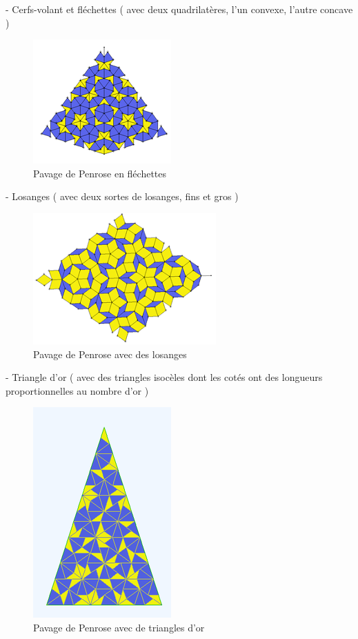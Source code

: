 \documentclass{article}
\begin{document}
- Cerfs-volant et fléchettes ( avec deux quadrilatères, l'un convexe, l'autre concave )

\begin{figure} [h]
    \center
    \includegraphics [scale=0.5] {image/penrose_flechette.png}
    \caption{Pavage de Penrose en fléchettes}
\end{figure}

- Losanges ( avec deux sortes de losanges, fins et gros )

\begin{figure} [h]
    \center
    \includegraphics [scale=0.5] {image/penrose_losange.png}
    \caption{Pavage de Penrose avec des losanges}
\end{figure}

- Triangle d’or ( avec des triangles isocèles dont les cotés ont des longueurs proportionnelles au nombre d’or )

\begin{figure} [h]
    \center
    \includegraphics [scale=0.5] {image/penrose_tri.png}
    \caption{Pavage de Penrose avec de triangles d'or}
\end{figure}
\end{document}
